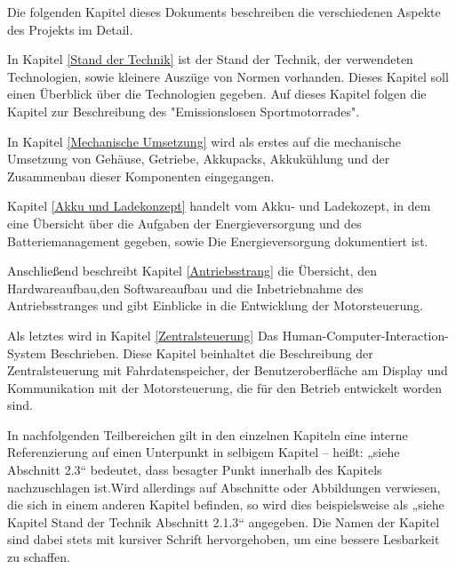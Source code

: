 Die folgenden Kapitel dieses Dokuments beschreiben die verschiedenen Aspekte des Projekts im Detail. 

In Kapitel \ref{Stand der Technik} ist der Stand der Technik, der verwendeten Technologien, sowie kleinere Auszüge von Normen vorhanden. Dieses Kapitel soll einen Überblick über die Technologien gegeben. Auf dieses Kapitel folgen die Kapitel zur Beschreibung des "Emissionslosen Sportmotorrades". 

In Kapitel \ref{Mechanische Umsetzung} wird als erstes auf die mechanische Umsetzung von Gehäuse, Getriebe, Akkupacks, Akkukühlung und der Zusammenbau dieser Komponenten eingegangen. 

Kapitel \ref{Akku und Ladekonzept} handelt vom Akku- und Ladekozept, in dem eine Übersicht über die Aufgaben der Energieversorgung und des Batteriemanagement gegeben, sowie Die Energieversorgung dokumentiert ist. 

Anschließend beschreibt Kapitel \ref{Antriebsstrang} die Übersicht, den Hardwareaufbau,den Softwareaufbau und die Inbetriebnahme des Antriebsstranges und gibt Einblicke in die Entwicklung der Motorsteuerung. 

Als letztes wird in Kapitel \ref{Zentralsteuerung} Das Human-Computer-Interaction-System Beschrieben. Diese Kapitel beinhaltet die Beschreibung der Zentralsteuerung mit Fahrdatenspeicher, der Benutzeroberfläche am Display und Kommunikation mit der Motorsteuerung, die für den Betrieb entwickelt worden sind.

In nachfolgenden Teilbereichen gilt in den einzelnen Kapiteln eine interne Referenzierung auf einen Unterpunkt in selbigem Kapitel – heißt: „siehe Abschnitt 2.3“ bedeutet, dass besagter Punkt innerhalb des Kapitels nachzuschlagen ist.Wird allerdings auf Abschnitte oder Abbildungen verwiesen, die sich in einem anderen Kapitel befinden, so wird dies beispielsweise als „siehe Kapitel Stand der Technik Abschnitt 2.1.3“ angegeben. Die Namen der Kapitel sind dabei stets mit kursiver Schrift hervorgehoben, um eine bessere Lesbarkeit zu schaffen.